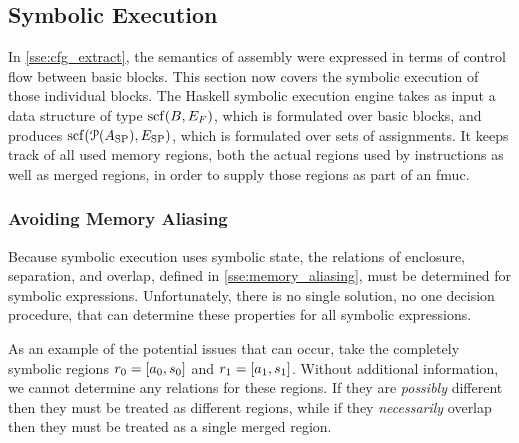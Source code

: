 
\subsection{Symbolic Execution}\label{sse:syntax_symb}
In \cref{sse:cfg_extract}, the semantics of assembly were expressed%
in terms of control flow between basic blocks.
This section now covers the symbolic execution of those individual blocks.
The Haskell symbolic execution engine
takes as input a data structure of type $\operatorname{scf}(B,E_F)$,
which is formulated over basic blocks,
and produces $\operatorname{scf}(\operatorname{\mathcal{P}}(A_\mathrm{SP}),E_\mathrm{SP})$,%
which is formulated over sets of assignments.
It keeps track of all used memory regions,
both the actual regions used by instructions as well as merged regions,
in order to supply those regions as part of an \ac{fmuc}.

\subsubsection{Avoiding Memory Aliasing}
Because symbolic execution uses symbolic state,
the relations of enclosure, separation, and overlap,
defined in \cref{sse:memory_aliasing}, must be determined for symbolic expressions.
Unfortunately, there is no single solution, no one decision procedure,
that can determine these properties for all symbolic expressions.

As an example of the potential issues that can occur,
take the completely symbolic regions $r_0=[a_0,s_0]$
and $r_1=[a_1,s_1]$.
Without additional information, we cannot determine any relations for these regions.
If they are \emph{possibly} different then they must be treated as different regions,
while if they \emph{necessarily} overlap
then they must be treated as a single merged region.

